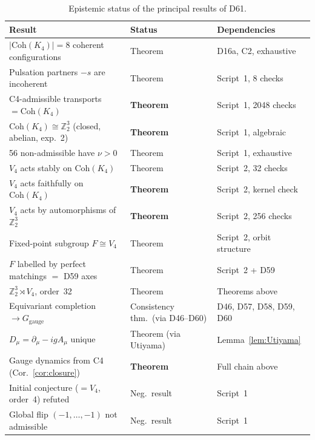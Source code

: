 \documentclass[11pt,a4paper]{article}
\theoremstyle{plain}
\theoremstyle{definition}
\theoremstyle{remark}
\newcommand{\Vfour}{V_4}
\newcommand{\Ggauge}{G_{\mathrm{gauge}}}
\newcommand{\Coh}{\mathrm{Coh}(K_4)}
\newcommand{\Dmu}{D_\mu}
\begin{document}
\begin{table}[H]
\centering
\caption{Epistemic status of the principal results of D61.}
\label{tab:epistemic}
\small
\renewcommand{\arraystretch}{1.3}
\begin{tabular}{p{7.0cm}p{2.6cm}p{4.5cm}}
\toprule
Result & Status & Dependencies \\
\midrule
$|\Coh| = 8$ coherent configurations & Theorem & D16a, C2, exhaustive \\
Pulsation partners $-s$ are incoherent & Theorem & Script~1, 8 checks \\
C4-admissible transports $= \Coh$ & \textcolor{proofblue}{\textbf{Theorem}} & Script~1, 2048 checks \\
$\Coh \cong \mathbb{Z}_2^3$ (closed, abelian, exp.~2) & \textcolor{proofblue}{\textbf{Theorem}} & Script~1, algebraic \\
56 non-admissible have $\nu > 0$ & Theorem & Script~1, exhaustive \\
$\Vfour$ acts stably on $\Coh$ & Theorem & Script~2, 32 checks \\
$\Vfour$ acts faithfully on $\Coh$ & \textcolor{proofblue}{\textbf{Theorem}} & Script~2, kernel check \\
$\Vfour$ acts by automorphisms of $\mathbb{Z}_2^3$ & \textcolor{proofblue}{\textbf{Theorem}} & Script~2, 256 checks \\
Fixed-point subgroup $F \cong \Vfour$ & Theorem & Script~2, orbit structure \\
$F$ labelled by perfect matchings $= $ D59 axes & Theorem & Script~2 + D59 \\
$\mathbb{Z}_2^3 \rtimes \Vfour$, order~32 & Theorem & Theorems above \\
Equivariant completion $\to \Ggauge$ & Consistency thm.\ (via D46--D60) & D46, D57, D58, D59, D60 \\
$\Dmu = \partial_\mu - igA_\mu$ unique & Theorem (via Utiyama) & Lemma~\ref{lem:Utiyama} \\
Gauge dynamics from C4 (Cor.~\ref{cor:closure}) & \textcolor{proofblue}{\textbf{Theorem}} & Full chain above \\
\midrule
Initial conjecture ($=\Vfour$, order~4) refuted & Neg.\ result & Script~1 \\
Global flip $(-1,\ldots,-1)$ not admissible & Neg.\ result & Script~1 \\
\bottomrule
\end{tabular}
\end{table}

\end{document}
